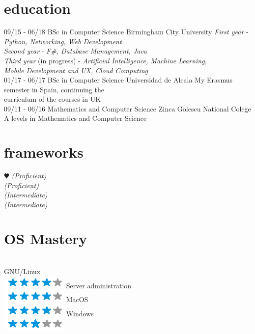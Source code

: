 \documentclass[]{friggeri-cv}
\begin{document}
\section{education}
\begin{entrylist}
  \entry
  {09/15 - 06/18}
  {BSc in Computer Science}
  {Birmingham City University}
  {
        \emph{First year }- \emph{Python, Networking, Web Development} \\
        \emph{Second year } - \emph{F\#, Database Management, Java} \\ 
        \emph{Third year } (in progress) - \emph{Artificial Intelligence, Machine Learning,   \\Mobile Development and UX, Cloud Computing}
  }
  \\
  \entry
  {01/17 - 06/17}
  {BSc in Computer Science }
  {Universidad de Alcala}
  {My Erasmus semester in Spain,  continuing  the \\curriculum of the courses in UK
  }
  \\
  \entry
  {09/11 - 06/16}
  {Mathematics and Computer Science}
  {Zinca Golescu National Colege}
  {A levels in Mathematics and Computer Science}

  \end{entrylist}


\newpage

\begin{aside2}
  \section{frameworks}
    {\color{red} $\varheartsuit$} 
     \emph{(Proficient)} \\
     \emph{(Proficient)} \\
     \emph {(Intermediate)}\\
     \emph {(Intermediate)}
    
  \section{OS Mastery}
  \\GNU/Linux  \\\includegraphics[scale=0.30]{img/4stars.png}
  Server administration \\\includegraphics[scale=0.30]{img/4stars.png}
  MacOS  \\\includegraphics[scale=0.30]{img/4stars.png}
  Windows  \\\includegraphics[scale=0.30]{img/3stars.png}
\end{aside2}
\end{document}
